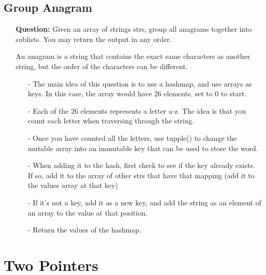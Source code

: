 \documentclass[12pt]{article}
\begin{document}
\subsection{Group Anagram}
\begin{enumerate}
  \item[] \textbf{Question:} Given an array of strings strs, group all anagrams together into sublists. You may return the output in any order.

An anagram is a string that contains the exact same characters as another string, but the order of the characters can be different.

    \begin{enumerate}
      \item[-] The main idea of this question is to use a hashmap, and use arrays as keys. In this case, the array would have 26 elements, set to 0 to start. 
      \item[-] Each of the 26 elements represents a letter a-z. The idea is that you count each letter when traversing through the string.  
      \item[-] Once you have counted all the letters, use tupple() to change the mutable array into an immutable key that can be used to store the word.
      \item[-] When adding it to the hash, first check to see if the key already exists. If so, add it to the array of other strs that have that mapping (add it to the values array at that key)
      \item[-] If it's not a key, add it as a new key, and add the string as an element of an array to the value at that position. 
      \item[-] Return the values of the hashmap. 
    \end{enumerate}
\end{enumerate}

\section{Two Pointers}
\end{document}
